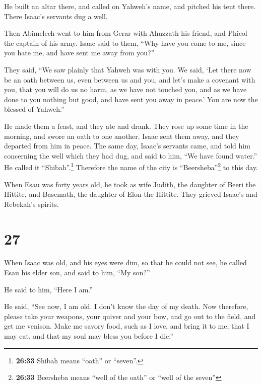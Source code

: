  He built an altar there, and called on Yahweh's name,
and pitched his tent there. There Isaac's servants dug a well.

 Then Abimelech went to him from Gerar with Ahuzzath his
friend, and Phicol the captain of his army.  Isaac said
to them, ``Why have you come to me, since you hate me, and have sent me
away from you?''

 They said, ``We saw plainly that Yahweh was with you. We
said, `Let there now be an oath between us, even between us and you, and
let's make a covenant with you,  that you will do us no
harm, as we have not touched you, and as we have done to you nothing but
good, and have sent you away in peace.' You are now the blessed of
Yahweh.''

 He made them a feast, and they ate and drank.
 They rose up some time in the morning, and swore an oath
to one another. Isaac sent them away, and they departed from him in
peace.  The same day, Isaac's servants came, and told him
concerning the well which they had dug, and said to him, ``We have found
water.''  He called it ``Shibah''.\footnote{\textbf{26:33}
  Shibah means ``oath'' or ``seven''.} Therefore the name of the city is
``Beersheba''\footnote{\textbf{26:33} Beersheba means ``well of the
  oath'' or ``well of the seven''} to this day.

 When Esau was forty years old, he took as wife Judith,
the daughter of Beeri the Hittite, and Basemath, the daughter of Elon
the Hittite.  They grieved Isaac's and Rebekah's spirits.

\hypertarget{section-26}{%
\section{27}\label{section-26}}

 When Isaac was old, and his eyes were dim, so that he
could not see, he called Esau his elder son, and said to him, ``My
son?''

He said to him, ``Here I am.''

 He said, ``See now, I am old. I don't know the day of my
death.  Now therefore, please take your weapons, your
quiver and your bow, and go out to the field, and get me venison.
 Make me savory food, such as I love, and bring it to me,
that I may eat, and that my soul may bless you before I die.''

